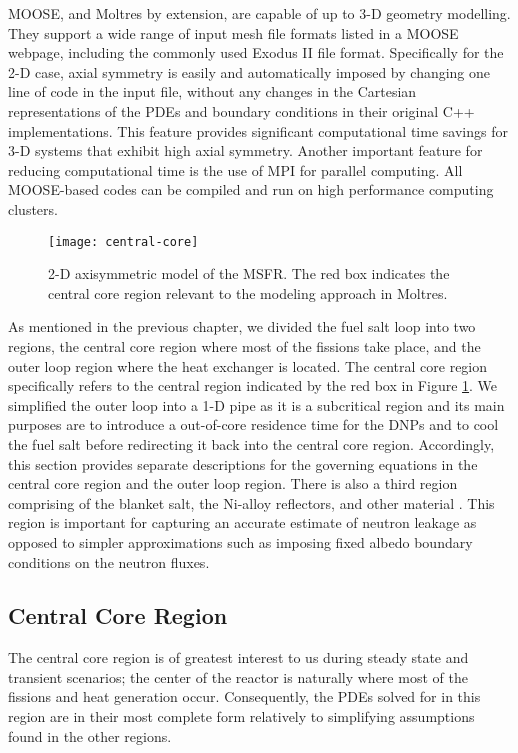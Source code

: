 \gls{MOOSE}, and Moltres by extension, are capable of up to 3-D geometry
modelling. They support a wide range of input mesh file formats listed in a
\gls{MOOSE} webpage, including the commonly used Exodus II file format.
Specifically for the 2-D case, axial symmetry is easily and automatically
imposed by changing one line of code in the input file, without any changes in
the Cartesian representations of the \glspl{PDE} and boundary conditions in
their original C++ implementations. This feature provides significant
computational time savings for 3-D systems that exhibit high axial symmetry.
Another important feature for reducing computational time is the use of MPI
for parallel computing. All \gls{MOOSE}-based codes can be compiled and
run on high performance computing clusters.

\begin{figure}[htb!]
    \centering
    \texttt{[image: central-core]}
    \caption{2-D axisymmetric model of the MSFR. The red box indicates the
    central core region relevant to the modeling approach in Moltres.}
    \label{fig:core}
\end{figure}

As mentioned in the previous chapter, we divided the fuel salt loop into two
regions, the central core region where most of the fissions take place, and
the outer loop region where the heat exchanger is located. The central core
region specifically refers to the central region indicated by
the red box in Figure \ref{fig:core}. We simplified the outer loop
into a 1-D pipe as it is a subcritical region and its main purposes are to
introduce a out-of-core residence time for the \glspl{DNP} and to cool the
fuel salt before redirecting it back into the central core region.
Accordingly, this section provides separate descriptions for the governing
equations in the central core region and the outer loop region. There is also
a third region comprising of the blanket salt, the Ni-alloy reflectors, 
and other material . This region is important for capturing an accurate
estimate of neutron leakage as opposed to simpler approximations such as
imposing fixed albedo boundary conditions on the neutron fluxes.

\subsection{Central Core Region}

The central core region is of greatest interest to us during steady state and
transient scenarios; the center of the reactor is naturally where most of the
fissions and heat generation occur. Consequently, the \glspl{PDE} solved for
in this region are in their most complete form relatively to simplifying
assumptions found in the other regions.

